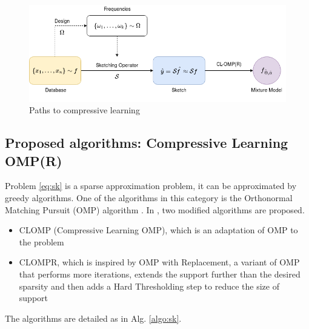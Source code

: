 \documentclass[12pt,a4paper]{article}
\begin{document}
\begin{figure}[h]
    \centering
    \includegraphics[scale = 0.5]{sketching.png}
    \caption{Paths to compressive learning\cite{keriven:hal-01329195}}
    \label{fig:sketching}
\end{figure}

\subsection{Proposed algorithms: Compressive Learning OMP(R)}
Problem \eqref{eq:sk} is a sparse approximation problem, it can be approximated by greedy algorithms.
One of the algorithms in this category is the Orthonormal Matching Pursuit (OMP) algorithm \cite{article}.
In \cite{keriven:hal-01329195}, two modified algorithms are proposed.
\begin{itemize}
    \item CLOMP (Compressive Learning OMP), which is an adaptation of OMP to the problem
    \item CLOMPR, which is inspired by OMP with Replacement, a variant of OMP that performs more iterations, extends the support further than the desired sparsity and then adds a Hard Thresholding step to reduce the size of support
\end{itemize}
The algorithms are detailed as in Alg. \ref{algo:sk}.
\end{document}
